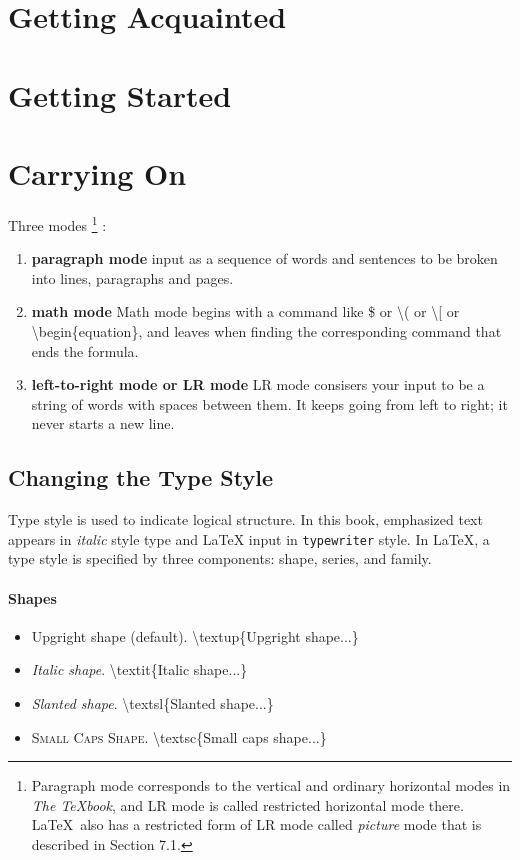 \documentclass[twocolumn]{book}        %
\begin{document}

\chapter{Getting Acquainted}

\chapter{Getting Started}

\chapter{Carrying On}

Three modes
\footnote{Paragraph mode corresponds to the vertical and ordinary horizontal modes in {\em The \TeX{}book}, and 
LR mode is called restricted horizontal mode there. \LaTeX\ also has a restricted form of LR mode called 
{\em picture} mode that is described in Section 7.1.}
:

\begin{enumerate}
\item \textbf{paragraph mode} input as a sequence of words and sentences to be broken into lines, paragraphs and pages.
\item \textbf{math mode} Math mode begins with a command like \$ or \textbackslash ( or \textbackslash [ or 
\textbackslash begin\{equation\}, and leaves when finding the corresponding command that ends the formula.
\item \textbf{left-to-right mode or LR mode} LR mode consisers your input to be a string of words with spaces between them. 
It keeps going from left to right; it never starts a new line.
\end{enumerate}

\section{Changing the Type Style}

Type style is used to indicate logical structure. In this book, emphasized text appears in {\em italic} style type and 
\LaTeX{} input in {\tt typewriter} style. In \LaTeX{}, a type style is specified by three components: 
shape, series, and family.

\subsubsection*{Shapes}
\begin{itemize}
    \item Upgright shape (default).  \textbackslash textup\{Upgright shape...\}
    \item {\em Italic shape}. \textbackslash textit\{Italic shape...\}
    \item \textsl{Slanted shape}. \textbackslash textsl\{Slanted shape...\}
    \item \textsc{Small Caps Shape.} \textbackslash textsc\{Small caps shape...\}
\end{itemize}
\end{document}
